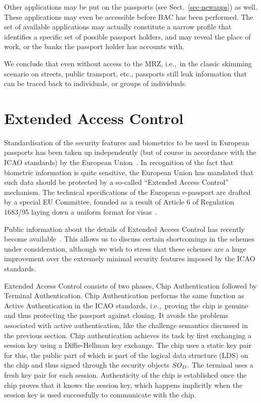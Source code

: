 \documentclass[runningheads,envcountsame,envcountsect,oribibl]{llncs}
\newcommand{\ie}{{i.e.},\ }		\newcommand{\eg}{{e.g.},\ }		\newcommand{\etal}{\textit{et al.}~}
\newcommand{\SOD}{\id{SO}_D}
\begin{document}
Other applications may be put on the passports (see 
Sect.~\ref{sec-newapps}) as well.
These applications may even be accessible before BAC has been performed.
The set of available applications may actually constitute a narrow profile that
identifies a specific set of possible passport holders,
and may reveal the place of work, or the banks the passport
holder has accounts with.

We conclude that even without access to the MRZ, \ie in the classic skimming
scenario on streets, public transport, etc.,
passports still leak information that can be traced back to individuals,
or groups of individuals.  



\section{Extended Access Control}
\label{sec-eac}

Standardisation of the security features and biometrics to be used in European
passports has been taken up independently (but of course in accordance with the
ICAO standards) by the European Union~\cite{COM(2004)0116}.
In recognition of the fact that biometric information is quite sensitive, the 
European Union has mandated that such data should be protected by a so-called
``Extended Access Control'' mechanism.
The technical specifications of the European e-passport are drafted by a
special EU Committee, founded as a result of
Article 6 of Regulation 1683/95 laying down a uniform
format for visas~\cite{COM(2001)577}.

Public information about the details of Extended Access Control 
has recently become
available~\cite{bsi2006extendedaccesscontrol,kuegler2005eac}. 
This allows us to discuss
certain shortcomings in the schemes under consideration, although we wish to
stress that these schemes are a huge improvement over the extremely minimal
security features imposed by the ICAO standards.

Extended Access Control consists of two phases, Chip Authentication followed
by Terminal Authentication. 
Chip Authentication performs the same function as
Active Authentication in the ICAO standards, \ie proving the chip is genuine
and thus protecting the passport against cloning. It avoids the problems
associated with active authentication, like the challenge semantics discussed
in the previous section. Chip authentication achieves its task by 
first exchanging a session key using a Diffie-Hellman key exchange.
The chip uses a static key pair for this, the public part of which is part of the
logical data structure (LDS) on the chip
and thus signed through the security objects $\SOD$. The terminal uses a fresh
key pair for each session. Authenticity of the chip is established once
the chip proves that it knows the session key, which happens implicitly
when the session key is used successfully to communicate with the chip.
\end{document}
